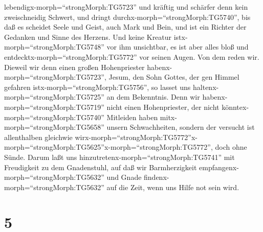 lebendigx-morph=``strongMorph:TG5723'' und kräftig und schärfer denn
kein zweischneidig Schwert, und dringt
durchx-morph=``strongMorph:TG5740'', bis daß es scheidet Seele und
Geist, auch Mark und Bein, und ist ein Richter der Gedanken und Sinne
des Herzens.  Und keine Kreatur
istx-morph=``strongMorph:TG5748'' vor ihm unsichtbar, es ist aber alles
bloß und entdecktx-morph=``strongMorph:TG5772'' vor seinen Augen. Von
dem reden wir.  Dieweil wir denn einen großen Hohenpriester
habenx-morph=``strongMorph:TG5723'', Jesum, den Sohn Gottes, der gen
Himmel gefahren istx-morph=``strongMorph:TG5756'', so lasset uns
haltenx-morph=``strongMorph:TG5725'' an dem Bekenntnis. 
Denn wir habenx-morph=``strongMorph:TG5719'' nicht einen Hohenpriester,
der nicht könntex-morph=``strongMorph:TG5740'' Mitleiden haben
mitx-morph=``strongMorph:TG5658'' unsern Schwachheiten, sondern der
versucht ist allenthalben gleichwie
wirx-morph=``strongMorph:TG5772''\textbar x-morph=``strongMorph:TG5625''x-morph=``strongMorph:TG5772'',
doch ohne Sünde.  Darum laßt uns
hinzutretenx-morph=``strongMorph:TG5741'' mit Freudigkeit zu dem
Gnadenstuhl, auf daß wir Barmherzigkeit
empfangenx-morph=``strongMorph:TG5632'' und Gnade
findenx-morph=``strongMorph:TG5632'' auf die Zeit, wenn uns Hilfe not
sein wird.

\hypertarget{section-4}{%
\section{5}\label{section-4}}

